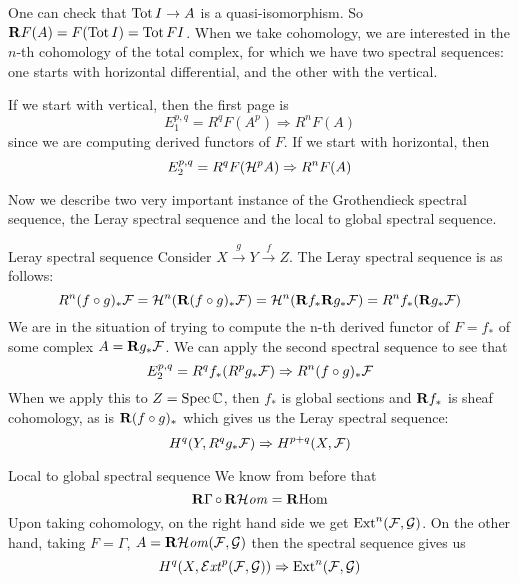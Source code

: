 
One can check that $\operatorname{Tot} I \to A$ is a quasi-isomorphism. So $\mathbf{R} F(A)=F(\operatorname{Tot} I)=\operatorname{Tot} FI$. When we take cohomology, we are interested in the $n$-th cohomology of the total complex, for which we have two spectral sequences: one starts with horizontal differential, and the other with the vertical.

If we start with vertical, then the first page is
\begin{equation*}
    E_1^{p,q} = R^qF(A^p) \Rightarrow R^nF(A)
\end{equation*}
since we are computing derived functors of $F$. If we start with horizontal, then
\begin{equation*}
    E_2^{p,q} = R^qF(\mathcal{H}^pA) \Rightarrow R^nF(A)
\end{equation*}

Now we describe two very important instance of the Grothendieck spectral sequence, the Leray spectral sequence and the local to global spectral sequence.

\begin{example}{Leray spectral sequence}{} Consider $X\xrightarrow{g}Y\xrightarrow{f}Z$. The Leray spectral sequence is as follows:
\begin{equation*}
    R^n(f\circ g)_*\mathcal{F}
        = \mathcal{H}^n(\mathbf{R}(f\circ g)_*\mathcal{F})
        = \mathcal{H}^n(\mathbf{R} f_*\mathbf{R} g_*\mathcal{F})
        = R^nf_*(\mathbf{R} g_*\mathcal{F})
\end{equation*}
We are in the situation of trying to compute the n-th derived functor of $F=f_*$ of some complex $A=\mathbf{R} g_*\mathcal{F}$. We can apply the second spectral sequence to see that
\begin{equation*}
    E_2^{p,q}
        = R^qf_*(R^pg_*\mathcal{F})
        \Rightarrow R^n(f\circ g)_*\mathcal{F}
\end{equation*}
When we apply this to $Z=\operatorname{Spec}\mathbb{C}$, then $f_*$ is global sections and $\mathbf{R} f_*$ is sheaf cohomology, as is $\mathbf{R}(f\circ g)_*$ which gives us the Leray spectral sequence:
\begin{equation*}
    H^q(Y,R^qg_*\mathcal{F}) \Rightarrow H^{p+q}(X,\mathcal{F})
\end{equation*}
\end{example}

\begin{example}{Local to global spectral sequence}{}
We know from before that
\begin{equation*}
    \operatorname{\mathbf{R}\Gamma}\circ\operatorname{\mathbf{R}\mathcal{H}\mathit{om}} = \operatorname{\mathbf{R} Hom}
\end{equation*}
Upon taking cohomology, on the right hand side we get $\operatorname{Ext}^n(\mathcal{F},\mathcal{G})$. On the other hand, taking $F=\Gamma$, $A=\operatorname{\mathbf{R}\mathcal{H}\mathit{om}}(\mathcal{F},\mathcal{G})$ then the spectral sequence gives us
\begin{equation*}
    H^q(X,\operatorname{\mathcal{E}\mathit{xt}}^p(\mathcal{F},\mathcal{G})) \Rightarrow \operatorname{Ext}^n(\mathcal{F},\mathcal{G})
\end{equation*}
\end{example}

